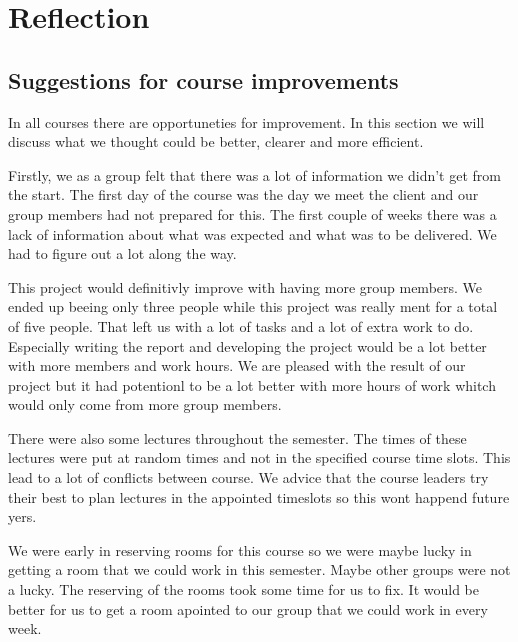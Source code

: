 
\chapter{Reflection}

\section{Suggestions for course improvements}
In all courses there are opportuneties for improvement.
In this section we will discuss what we thought could be better, clearer and more efficient.

Firstly, we as a group felt that there was a lot of information we didn't get from the start. 
The first day of the course was the day we meet the client and our group members had not prepared for this.
The first couple of weeks there was a lack of information about what was expected and what was to be delivered.
We had to figure out a lot along the way.

This project would definitivly improve with having more group members. 
We ended up beeing only three people while this project was really ment for a total of five people.
That left us with a lot of tasks and a lot of extra work to do.
Especially writing the report and developing the project would be a lot better with more members and work hours. 
We are pleased with the result of our project but it had potentionl to be a lot better with more hours of work whitch would only come from more group members. 

There were also some lectures throughout the semester. The times of these lectures were put at random times and not in the specified course time slots.
This lead to a lot of conflicts between course.
We advice that the course leaders try their best to plan lectures in the appointed timeslots so this wont happend future yers. 

We were early in reserving rooms for this course so we were maybe lucky in getting a room that we could work in this semester. Maybe other groups were not a lucky. 
The reserving of the rooms took some time for us to fix. 
It would be better for us to get a room apointed to our group that we could work in every week. 